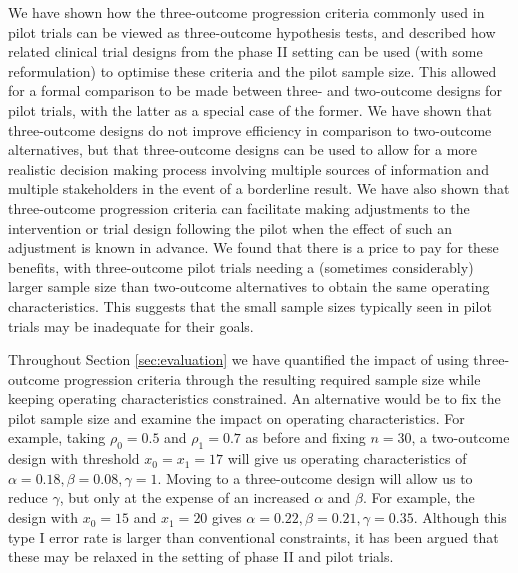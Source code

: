 \documentclass[referee, lineno, pdflatex,sn-vancouver,Numbered]{sn-jnl}%
\theoremstyle{thmstyleone}%
\theoremstyle{thmstyletwo}%
\theoremstyle{thmstylethree}%
\begin{document}


We have shown how the three-outcome progression criteria commonly used in pilot trials can be viewed as three-outcome hypothesis tests, and described how related clinical trial designs from the phase II setting can be used (with some reformulation) to optimise these criteria and the pilot sample size. This allowed for a formal comparison to be made between three- and two-outcome designs for pilot trials, with the latter as a special case of the former. We have shown that three-outcome designs do not improve efficiency in comparison to two-outcome alternatives, but that three-outcome designs can be used to allow for a more realistic decision making process involving multiple sources of information and multiple stakeholders in the event of a borderline result. We have also shown that three-outcome progression criteria can facilitate making adjustments to the intervention or trial design following the pilot when the effect of such an adjustment is known in advance. We found that there is a price to pay for these benefits, with three-outcome pilot trials needing a (sometimes considerably) larger sample size than two-outcome alternatives to obtain the same operating characteristics. This suggests that the small sample sizes typically seen in pilot trials \cite{Billingham2013} may be inadequate for their goals.

Throughout Section \ref{sec:evaluation} we have quantified the impact of using three-outcome progression criteria through the resulting required sample size while keeping operating characteristics constrained. An alternative would be to fix the pilot sample size and examine the impact on operating characteristics. For example, taking $\rho_0 = 0.5$ and $\rho_1 = 0.7$ as before and fixing $n = 30$, a two-outcome design with threshold $x_0 = x_1 = 17$ will give us operating characteristics of $\alpha = 0.18, \beta = 0.08, \gamma = 1$. Moving to a three-outcome design will allow us to reduce $\gamma$, but only at the expense of an increased $\alpha$ and $\beta$. For example, the design with $x_0 = 15$ and $x_1 = 20$ gives  $\alpha = 0.22, \beta = 0.21, \gamma = 0.35$. Although this type I error rate is larger than conventional constraints, it has been argued that these may be relaxed in the setting of phase II \cite{Rubinstein2005, Hutson2012} and pilot \cite{Lee2014} trials.
\end{document}
